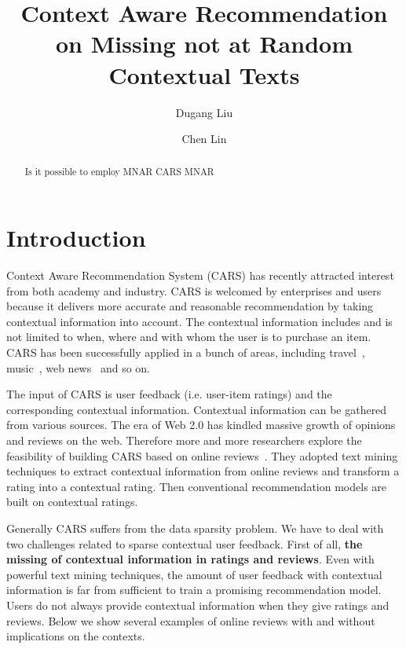 \documentclass{llncs}
\begin{document}
\title{Context Aware Recommendation on Missing not at Random Contextual Texts}
\author{Dugang Liu \and Chen Lin}
\maketitle

\begin{abstract}
Is it possible to employ MNAR CARS MNAR 
\end{abstract}

\section{Introduction}\label{sec:intro}
Context Aware Recommendation System (CARS) has recently attracted  interest from both academy and industry. CARS is welcomed by enterprises and users because it delivers more accurate and reasonable recommendation by taking contextual information into account. The contextual information includes and is not limited to when, where and with whom the user is to purchase an item. CARS has been successfully applied in a bunch of areas, including travel~\cite{Biancalana2013Approach}, music~\cite{Cai2007MusicSense}, web news~\cite{Wang2015CROWN} and so on. 


The input of CARS is user feedback (i.e. user-item ratings) and the corresponding contextual information. Contextual information can be gathered from various sources. The era of Web 2.0 has kindled massive growth of opinions and reviews on the web. Therefore more and more researchers explore the feasibility of building CARS based on online reviews~\cite{Li2010Contextual,Levi2012Finding,Hariri2013Query,Liu2013Combining,Marcelo2016Mining}. They adopted text mining techniques to extract contextual information from online reviews and transform a rating into a contextual rating. Then conventional recommendation models are built on contextual ratings.

Generally CARS suffers from the data sparsity problem. We have to deal with two challenges related to sparse contextual user feedback. First of all, \textbf{the missing of contextual information in ratings and reviews}. Even with powerful text mining techniques, the amount of user feedback with contextual information is far from sufficient to train a promising recommendation model. Users do not always provide contextual information when they give ratings and reviews. Below we show several examples of online reviews with and without implications on the contexts.
\end{document}
